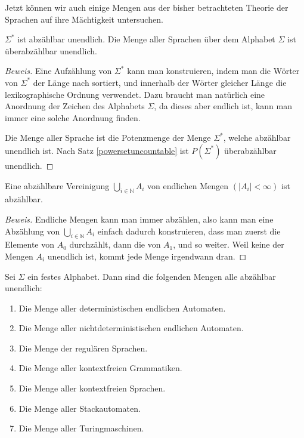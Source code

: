 Jetzt können wir auch einige Mengen aus der bisher betrachteten
Theorie der Sprachen auf ihre Mächtigkeit untersuchen.

\begin{satz}
$\Sigma^*$ ist abzählbar unendlich. Die Menge aller Sprachen über dem
Alphabet $\Sigma$ ist überabzählbar unendlich.
\end{satz}

\begin{proof}[Beweis]
Eine Aufzählung von $\Sigma^*$ kann man konstruieren, indem man
die Wörter von $\Sigma^*$ der Länge nach sortiert, und innerhalb
der Wörter gleicher Länge die lexikographische Ordnung verwendet.
Dazu braucht man natürlich eine Anordnung der Zeichen des Alphabets $\Sigma$,
da dieses aber endlich ist, kann man immer eine solche Anordnung finden.

Die Menge aller Sprache ist die Potenzmenge der Menge $\Sigma^*$, welche
abzählbar unendlich ist. Nach Satz \ref{powersetuncountable} ist
$P(\Sigma^*)$ überabzählbar unendlich.
\end{proof}

\begin{satz}\label{countablefinite}
Eine abzählbare Vereinigung $\bigcup_{i\in\mathbb N}A_i$ von endlichen
Mengen $(|A_i|<\infty)$ ist abzählbar.
\end{satz}

\begin{proof}[Beweis]
Endliche Mengen kann man immer abzählen, also kann man eine Abzählung
von $\bigcup_{i\in\mathbb N}A_i$ einfach dadurch konstruieren, dass
man zuerst die Elemente von $A_0$ durchzählt, dann die von $A_1$, und
so weiter. Weil keine der Mengen $A_i$ unendlich ist, kommt jede
Menge irgendwann dran.
\end{proof}

\begin{satz} Sei $\Sigma$ ein festes Alphabet. Dann sind die folgenden
Mengen alle abzählbar unendlich:
\begin{enumerate}
\item Die Menge aller deterministischen endlichen Automaten.
\item Die Menge aller nichtdeterministischen endlichen Automaten.
\item Die Menge der regulären Sprachen.
\item Die Menge aller kontextfreien Grammatiken.
\item Die Menge aller kontextfreien Sprachen.
\item Die Menge aller Stackautomaten.
\item Die Menge aller Turingmaschinen.
\end{enumerate}
\end{satz}

